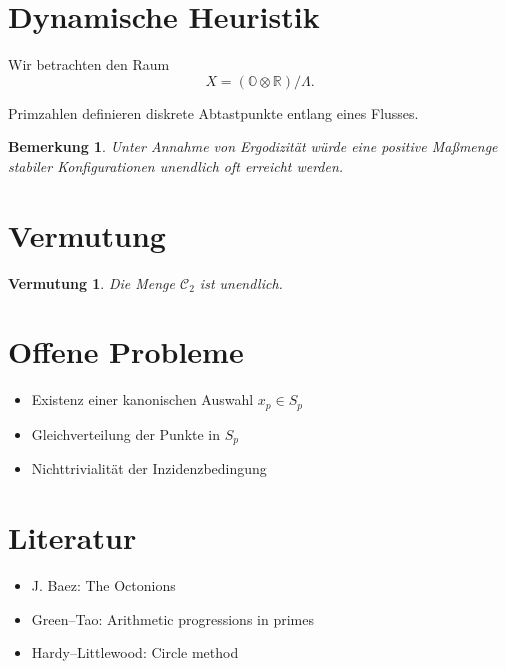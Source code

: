 \documentclass[11pt]{article}
\newtheorem{remark}{Bemerkung}
\newtheorem{conjecture}{Vermutung}
\begin{document}
	\section{Dynamische Heuristik}
	
	Wir betrachten den Raum
	\[
	X = (\mathbb{O}\otimes\mathbb{R})/\Lambda.
	\]
	
	Primzahlen definieren diskrete Abtastpunkte entlang eines Flusses.
	
	\begin{remark}
		Unter Annahme von Ergodizität würde eine positive Maßmenge stabiler Konfigurationen unendlich oft erreicht werden.
	\end{remark}
	
	\section{Vermutung}
	
	\begin{conjecture}
		Die Menge $\mathcal{C}_2$ ist unendlich.
	\end{conjecture}
	
	\section{Offene Probleme}
	
	\begin{itemize}
		\item Existenz einer kanonischen Auswahl $x_p\in S_p$
		\item Gleichverteilung der Punkte in $S_p$
		\item Nichttrivialität der Inzidenzbedingung
	\end{itemize}
	
	\section{Literatur}
	
	\begin{itemize}
		\item J. Baez: The Octonions
		\item Green--Tao: Arithmetic progressions in primes
		\item Hardy--Littlewood: Circle method
	\end{itemize}
	
\end{document}
